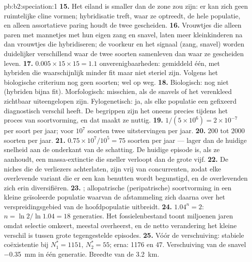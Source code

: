 \begin{solution}{pb:b2:speciation:1}
\textbf{15.} Het eiland is smaller dan de zone zou zijn: er kan zich geen
ruimtelijke cline vormen; hybridisatie treft, waar ze optreedt, de
hele populatie, en alleen assortatieve paring houdt de twee
gescheiden.
\textbf{16.} Vrouwtjes die alleen paren met mannetjes met hun eigen zang en
snavel, laten meer kleinkinderen na dan vrouwtjes die hybridiseren; de
voorkeur en het signaal (zang, snavel) worden duidelijker verschillend waar de
twee soorten samenleven dan waar ze gescheiden leven.
\textbf{17.} $0.005\times 15\times 15 = 1.1$ onverenigbaarheden: gemiddeld
één, met hybriden die waarschijnlijk minder fit maar niet steriel zijn. Volgens
het biologische criterium nog geen soorten; wel op weg.
\textbf{18.} Biologisch: nog niet (hybriden bijna fit).
Morfologisch: misschien, als de snavels of het verenkleed zichtbaar
uiteengelopen zijn. Fylogenetisch: ja, als elke populatie een gefixeerd
diagnostisch verschil heeft. De begrippen zijn het oneens precies tijdens het
proces van soortvorming, en dat maakt ze nuttig.
\textbf{19.} $1/(5\times 10^{6}) = 2\times 10^{-7}$ per soort per
jaar; voor $10^{7}$ soorten twee uitstervingen per jaar.
\textbf{20.} 200 tot 2000 soorten per jaar.
\textbf{21.} $0.75\times 10^{7}/10^{5} = 75$ soorten per jaar --- lager
dan de huidige snelheid aan de onderkant van de schatting. De huidige episode
is, als ze aanhoudt, een massa-extinctie die sneller verloopt dan de grote
vijf.
\textbf{22.} De niches die de verliezers achterlaten, zijn vrij van
concurrenten, zodat elke overlevende variant die er een kan benutten wordt
begunstigd, en de overlevenden zich erin diversifiëren.
\textbf{23.} ; allopatrische (peripatrische)
soortvorming in een kleine geïsoleerde populatie waarvan de afstammeling zich
daarna over het verspreidingsgebied van de hoofdpopulatie uitbreidt.
\textbf{24.} $1.04^{n} = 2$: $n = \ln 2/\ln 1.04 = 18$ generaties.
Het fossielenbestand toont miljoenen jaren omdat selectie omkeert,
 meestal overheerst, en de netto verandering het kleine
verschil is tussen grote tegengestelde episodes.
\textbf{25.} Vóór de verschuiving: stabiele coëxistentie bij $N_1^{*} =
1151$, $N_2^{*} = 55$; erna: 1176 en 47. Verschuiving van de snavel
\qty{-0.35}{mm} in één generatie. Breedte van de  \qty{3.2}{km}.
\end{solution}
